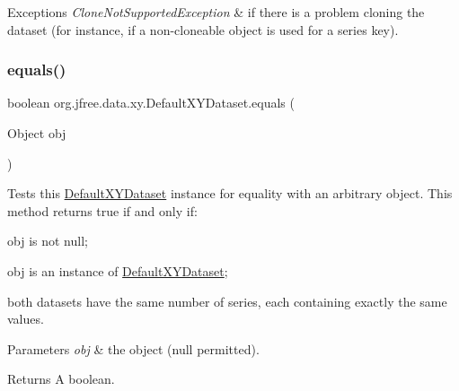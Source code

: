 \begin{DoxyExceptions}{Exceptions}
{\em Clone\+Not\+Supported\+Exception} & if there is a problem cloning the dataset (for instance, if a non-\/cloneable object is used for a series key). \\
\hline
\end{DoxyExceptions}
\mbox{\label{classorg_1_1jfree_1_1data_1_1xy_1_1_default_x_y_dataset_a052652bf9cfccae599debee96b44d9be}} 
\subsubsection{\texorpdfstring{equals()}{equals()}}
{\footnotesize\ttfamily boolean org.\+jfree.\+data.\+xy.\+Default\+X\+Y\+Dataset.\+equals (\begin{DoxyParamCaption}\item[{Object}]{obj }\end{DoxyParamCaption})}

Tests this {\ttfamily \mbox{\hyperlink{classorg_1_1jfree_1_1data_1_1xy_1_1_default_x_y_dataset}{Default\+X\+Y\+Dataset}}} instance for equality with an arbitrary object. This method returns {\ttfamily true} if and only if\+: 
\begin{DoxyItemize}
\item {\ttfamily obj} is not {\ttfamily null}; 
\item {\ttfamily obj} is an instance of {\ttfamily \mbox{\hyperlink{classorg_1_1jfree_1_1data_1_1xy_1_1_default_x_y_dataset}{Default\+X\+Y\+Dataset}}}; 
\item both datasets have the same number of series, each containing exactly the same values. 
\end{DoxyItemize}


\begin{DoxyParams}{Parameters}
{\em obj} & the object ({\ttfamily null} permitted).\\
\hline
\end{DoxyParams}
\begin{DoxyReturn}{Returns}
A boolean. 
\end{DoxyReturn}
\mbox{\label{classorg_1_1jfree_1_1data_1_1xy_1_1_default_x_y_dataset_ae665218f6d5daa96f37e198265f72200}} 
